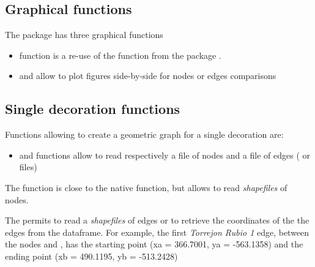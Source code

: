 \documentclass[article]{jss}\usepackage{knitr}
\begin{document}
\subsection{Graphical functions} \label{sec:functions_gr}

The  package has three graphical functions
\begin{itemize}
\setlength\itemsep{.1em}
\item {} function is a re-use of the  function from the  package \citep{Snow20}.
\item {} and  allow to plot figures side-by-side for nodes or edges comparisons
\end{itemize}

\subsection{Single decoration functions} \label{sec:functions_one}

Functions allowing to create a geometric graph for a single decoration are:

\begin{itemize}
\setlength\itemsep{.1em}
  \item {} and  functions allow to read respectively a file of nodes and a file of edges ( or  files)
\end{itemize}

The  function is close to the native   function, but allows to read \emph{shapefiles} of nodes.

The  permits to read a \emph{shapefiles} of edges or to retrieve the coordinates of the the edges from the  dataframe. For example, the first \emph{Torrejon Rubio 1} edge, between the nodes  and , has the starting point (xa = 366.7001, ya = -563.1358) and the ending point (xb = 490.1195, yb = -513.2428)
\end{document}

